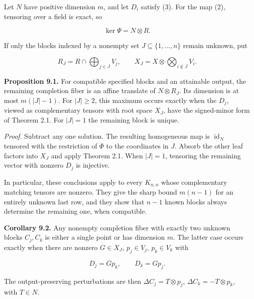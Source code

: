 \documentclass[11pt]{article}
\begin{document}
Let $N$ have positive dimension $m$, and let $D_i$ satisfy (3). For the map (2), tensoring over a field is exact, so


\nopagebreak[4]

\begin{equation}
\ker\Psi=N\otimes R.
\tag{42}
\end{equation}

If only the blocks indexed by a nonempty set $J\subseteq\{1,\ldots,n\}$ remain unknown, put


\nopagebreak[4]

\begin{equation}
R_J=R\cap\bigoplus_{j\in J}V_j,\qquad
X_J=X\otimes\bigotimes_{i\notin J}V_i.
\tag{43}
\end{equation}

\textbf{Proposition 9.1.} For compatible specified blocks and an attainable output, the remaining completion fiber is an affine translate of $N\otimes R_J$. Its dimension is at most $m(|J|-1)$. For $|J|\geq2$, this maximum occurs exactly when the $D_j$, viewed as complementary tensors with root space $X_J$, have the signed-minor form of Theorem 2.1. For $|J|=1$ the remaining block is unique.


\nopagebreak[4]

\emph{Proof.} Subtract any one solution. The resulting homogeneous map is $\operatorname{id}_N$ tensored with the restriction of $\Phi$ to the coordinates in $J$. Absorb the other leaf factors into $X_J$ and apply Theorem 2.1. When $|J|=1$, tensoring the remaining vector with nonzero $D_j$ is injective.


In particular, these conclusions apply to every $K_{n,n}$ whose complementary matching tensors are nonzero. They give the sharp bound $m(n-1)$ for an entirely unknown last row, and they show that $n-1$ known blocks always determine the remaining one, when compatible.


\textbf{Corollary 9.2.} Any nonempty completion fiber with exactly two unknown blocks $C_j,C_k$ is either a single point or has dimension $m$. The latter case occurs exactly when there are nonzero $G\in X_J$, $p_j\in V_j$, $p_k\in V_k$ with


\nopagebreak[4]

\begin{equation}
D_j=Gp_k,\qquad D_k=Gp_j.
\tag{44}
\end{equation}

The output-preserving perturbations are then $\Delta C_j=T\otimes p_j$, $\Delta C_k=-T\otimes p_k$, with $T\in N$.
\end{document}
